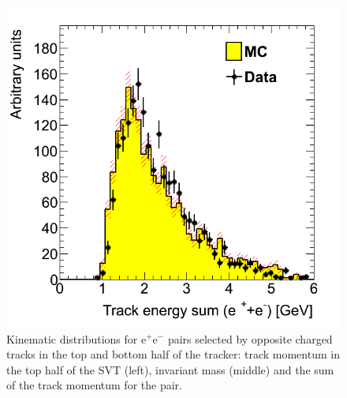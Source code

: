 \begin{figure}[ht]
   \includegraphics[scale=0.25]{test2012/vertexing/figures/h_sumE_h_sumE_dataMC_trigseltwotrksel4hit_recoilmc_twotrkfilt.png}
\caption{\small{Kinematic distributions for e$^+$e$^-$ pairs selected by opposite charged tracks in the top and bottom half of the tracker: track momentum in the top half of the SVT (left), invariant mass (middle) and the sum of the track momentum for the pair.}} 
\label{fig:pair_kin}
\end{figure}

